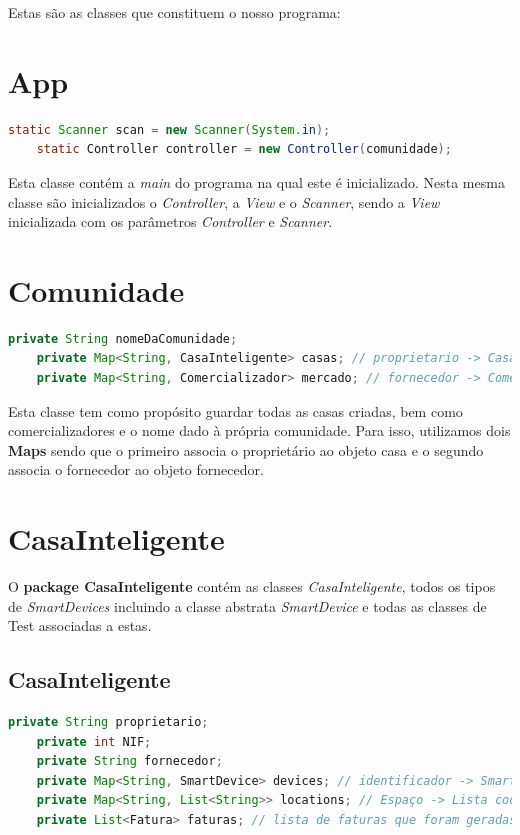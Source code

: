 \documentclass[11pt,a4paper]{report}
\begin{document}
	Estas são as classes que constituem o nosso programa:
	
    \section{App}
    \begin{lstlisting}[language=java,firstnumber=1]
    static Scanner scan = new Scanner(System.in);
    static Controller controller = new Controller(comunidade);
    \end{lstlisting}
    
    Esta classe contém a \textit{main} do programa na qual este é inicializado.
    Nesta mesma classe são inicializados o \textit{ Controller}, a \textit{View} e o \textit{ Scanner}, sendo a \textit{View} inicializada com os parâmetros \textit{ Controller} e \textit{ Scanner}.
    
    \section{Comunidade}
	\begin{lstlisting}[language=java,firstnumber=1]
    private String nomeDaComunidade;
    private Map<String, CasaInteligente> casas; // proprietario -> Casa
    private Map<String, Comercializador> mercado; // fornecedor -> Comercializador
    \end{lstlisting}
    
    Esta classe tem como propósito guardar todas as casas criadas, bem como comercializadores e o nome dado à própria comunidade. Para isso, utilizamos dois \textbf{Maps} sendo que o primeiro associa o proprietário ao objeto casa e o segundo associa o fornecedor ao objeto fornecedor.  
    
	\section{CasaInteligente}
	
	O \textbf{package CasaInteligente} contém as classes \textit{CasaInteligente}, todos os tipos de \textit{SmartDevices} incluindo a classe abstrata \textit{SmartDevice} e todas as classes de Test associadas a estas.
	
	\subsection{CasaInteligente}
	\begin{lstlisting}[language=java,firstnumber=1]
    private String proprietario;
    private int NIF;
    private String fornecedor;
    private Map<String, SmartDevice> devices; // identificador -> SmartDevice
    private Map<String, List<String>> locations; // Espaço -> Lista codigo dos devices
    private List<Fatura> faturas; // lista de faturas que foram geradas e associadas à casa
    \end{lstlisting}
    
\end{document}
